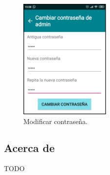 \begin{figure}[H]
	\centering
	\includegraphics[width=0.4\textwidth]{../img/cambiarcontrasena.png}
	\caption{Modificar contraseña.}
	\label{fig:cambiarcontrasena}
\end{figure} 

\subsection{Acerca de}

TODO



